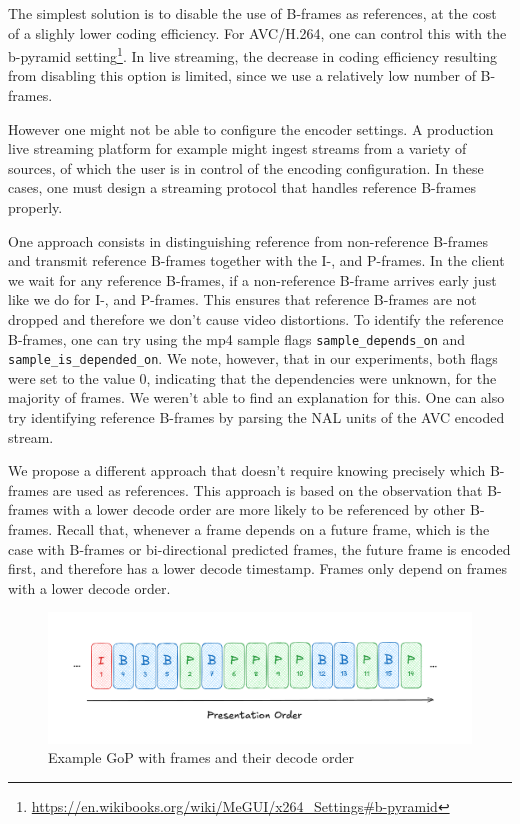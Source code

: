 The simplest solution is to disable the use of B-frames as references, at the cost of a slighly lower coding efficiency. For AVC/H.264, one can control this with the b-pyramid setting\footnote{\url{https://en.wikibooks.org/wiki/MeGUI/x264\_Settings\#b-pyramid}}. In live streaming, the decrease in coding efficiency resulting from disabling this option is limited, since we use a relatively low number of B-frames.

However one might not be able to configure the encoder settings. A production live streaming platform for example might ingest streams from a variety of sources, of which the user is in control of the encoding configuration. In these cases, one must design a streaming protocol that handles reference B-frames properly.

One approach consists in distinguishing reference from non-reference B-frames and transmit reference B-frames together with the I-, and P-frames. In the client we wait for any reference B-frames, if a non-reference B-frame arrives early just like we do for I-, and P-frames. This ensures that reference B-frames are not dropped and therefore we don't cause video distortions. To identify the reference B-frames, one can try using the mp4 sample flags \lstinline{sample_depends_on} and \lstinline{sample_is_depended_on}. %
We note, however, that in our experiments, both flags were set to the value $0$, indicating that the dependencies were unknown, for the majority of frames. We weren't able to find an explanation for this. One can also try identifying reference B-frames by parsing the \ac{NAL} units of the AVC encoded stream. 

We propose a different approach that doesn't require knowing precisely which B-frames are used as references. This approach is based on the observation that B-frames with a lower decode order are more likely to be referenced by other B-frames. Recall that, whenever a frame depends on a future frame, which is the case with B-frames or bi-directional predicted frames, the future frame is encoded first, and therefore has a lower decode timestamp. Frames only depend on frames with a lower decode order. 

\begin{figure}
    \centering
    \includegraphics[width=\textwidth]{figures/gop_structure.png}
    \caption{Example \ac{GoP} with frames and their decode order}
    \label{fig:gop_structure}
\end{figure}


